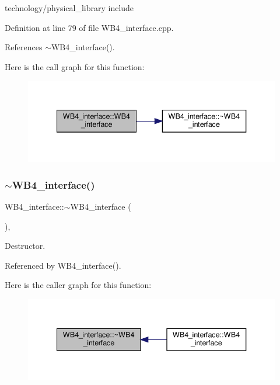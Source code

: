 technology/physical\+\_\+library include 

Definition at line 79 of file W\+B4\+\_\+interface.\+cpp.



References $\sim$\+W\+B4\+\_\+interface().

Here is the call graph for this function\+:
\nopagebreak
\begin{figure}[H]
\begin{center}
\leavevmode
\includegraphics[width=340pt]{d5/d7a/classWB4__interface_a39e36195577d336179b46567f1d18941_cgraph}
\end{center}
\end{figure}
\mbox{\label{classWB4__interface_a9901f252cb1d4d731b7b66a8be586e6c}} 
\subsubsection{\texorpdfstring{$\sim$\+W\+B4\+\_\+interface()}{~WB4\_interface()}}
{\footnotesize\ttfamily W\+B4\+\_\+interface\+::$\sim$\+W\+B4\+\_\+interface (\begin{DoxyParamCaption}{ }\end{DoxyParamCaption})\hspace{0.3cm}{\ttfamily [override]}, {\ttfamily [default]}}



Destructor. 



Referenced by W\+B4\+\_\+interface().

Here is the caller graph for this function\+:
\nopagebreak
\begin{figure}[H]
\begin{center}
\leavevmode
\includegraphics[width=340pt]{d5/d7a/classWB4__interface_a9901f252cb1d4d731b7b66a8be586e6c_icgraph}
\end{center}
\end{figure}


